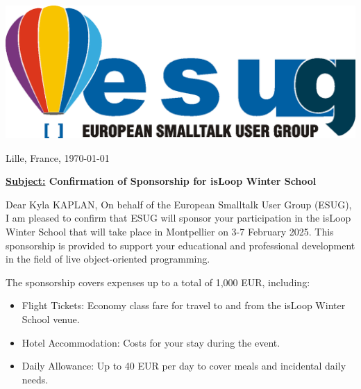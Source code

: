 \documentclass[parskip=full*,fontsize=10pt,BCOR=0pt,DIV=15]{scrreprt}
\begin{document}
\begin{center}
  \includegraphics[width=.4\textwidth]{esug-logo}
\end{center}

\begin{flushright}
  Lille, France, \today
\end{flushright}


\textbf{\underline{Subject:}
 Confirmation of Sponsorship for isLoop Winter School}

Dear Kyla KAPLAN,
On behalf of the European Smalltalk User Group (ESUG), I am pleased to confirm that ESUG will
sponsor your participation in the isLoop Winter School that will take place in Montpellier on 3-7
February 2025. This sponsorship is provided to support your educational and professional
development in the field of live object-oriented programming.

The sponsorship covers expenses up to a total of 1,000 EUR, including:
\begin{itemize} 
\item Flight Tickets: Economy class fare for travel to and from the isLoop Winter School venue.
\item  Hotel Accommodation: Costs for your stay during the event.
\item  Daily Allowance: Up to 40 EUR per day to cover meals and incidental daily needs.
\end{itemize}
\end{document}
